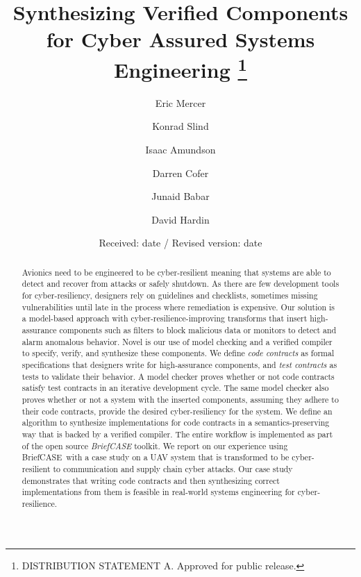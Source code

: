 \documentclass[global,twocolumn]{svjour}
\newcommand{\brfcs}{BriefCASE}
\begin{document}
\title{
  Synthesizing Verified Components for Cyber Assured Systems Engineering
  \thanks{DISTRIBUTION STATEMENT A.  Approved for public release.}
}

\author{
  Eric Mercer    \and
  Konrad Slind   \and
  Isaac Amundson \and
  Darren Cofer   \and
  Junaid Babar   \and
  David Hardin
}


\date{Received: date / Revised version: date}

\maketitle

\begin{abstract}
Avionics need to be engineered to be cyber-resilient meaning that systems are able to detect and recover from attacks or safely shutdown.
%
As there are few development tools for cyber-resiliency, designers rely on guidelines and checklists, sometimes missing vulnerabilities until late in the process where remediation is expensive.
%
Our solution is a model-based approach with cyber-resilience-improving transforms that insert high-assurance components such as filters to block malicious data or monitors to detect and alarm anomalous behavior.
%
Novel is our use of model checking and a verified compiler to specify, verify, and synthesize these components.
%
We define \emph{code contracts} as formal specifications that designers write for high-assurance components, and \emph{test contracts} as tests to validate their behavior.
%
A model checker proves whether or not code contracts satisfy test contracts in an iterative development cycle.
%
The same model checker also proves whether or not a system with the inserted components, assuming they adhere to their code contracts, provide the desired cyber-resiliency for the system.
%
We define an algorithm to synthesize implementations for code contracts in a semantics-preserving way that is backed by a verified compiler.
%
The entire workflow is implemented as part of the open source \emph{\brfcs} toolkit.
%
We report on our experience using \brfcs\ with a case study on a UAV system that is transformed to be cyber-resilient to communication and supply chain cyber attacks.
%
Our case study demonstrates that writing code contracts and then synthesizing correct implementations from them is feasible in real-world systems engineering for cyber-resilience.
\end{abstract}
\end{document}
